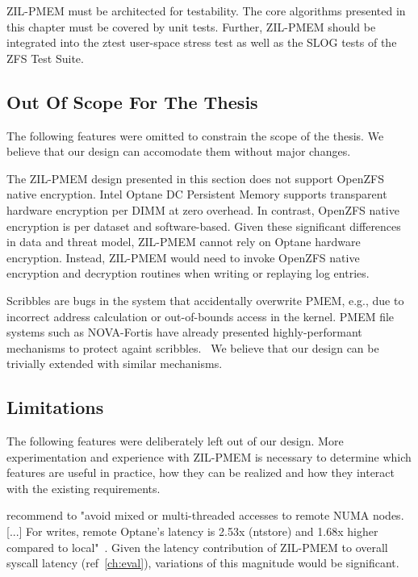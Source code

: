 \documentclass[12pt,a4paper,twoside,draft]{book}
\begin{document}
ZIL-PMEM must be architected for testability.
The core algorithms presented in this chapter must be covered by unit tests.
Further, ZIL-PMEM should be integrated into the ztest user-space stress test as well as the SLOG tests of the ZFS Test Suite.

\subsection{Out Of Scope For The Thesis}
The following features were omitted to constrain the scope of the thesis.
We believe that our design can accomodate them without major changes.

The ZIL-PMEM design presented in this section does not support OpenZFS native encryption.
Intel Optane DC Persistent Memory supports transparent hardware encryption per DIMM at zero overhead.
In contrast, OpenZFS native encryption is per dataset and software-based.
Given these significant differences in data and threat model, ZIL-PMEM cannot rely on Optane hardware encryption.
Instead, ZIL-PMEM would need to invoke OpenZFS native encryption and decryption routines when writing or replaying log entries.

Scribbles are bugs in the system that accidentally overwrite PMEM, e.g., due to incorrect address calculation or out-of-bounds access in the kernel.
PMEM file systems such as NOVA-Fortis have already presented highly-performant mechanisms to protect againt scribbles.~\cite{xu_nova-fortis_2017}
We believe that our design can be trivially extended with similar mechanisms.

\subsection{Limitations}
The following features were deliberately left out of our design.
More experimentation and experience with ZIL-PMEM is necessary to determine which features are useful in practice, how they can be realized and how they interact with the existing requirements.

\citeauthor{yang_empirical_2020} recommend to "avoid mixed or multi-threaded accesses to remote NUMA nodes. [...]  For writes, remote Optane’s latency is 2.53x (ntstore) and 1.68x higher compared to local"~\cite{yang_empirical_2020}.
Given the latency contribution of ZIL-PMEM to overall syscall latency (ref~\ref{ch:eval}), variations of this magnitude would be significant.
\end{document}
